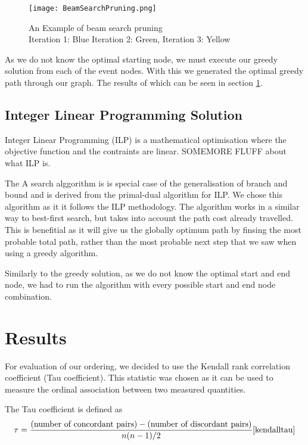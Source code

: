 \documentclass[bsc,frontabs,twoside,singlespacing,parskip,deptreport]{infthesis}     %
\begin{document}
\begin{figure}
  \texttt{[image: BeamSearchPruning.png]}
  \caption{An Example of beam search pruning\\ Iteration 1: Blue Iteration 2: Green, Iteration 3: Yellow}
  \label{fig:beam-prune}
\end{figure}

As we do not know the optimal starting node, we must execute our greedy solution from each of the event nodes.
With this we generated the optimal greedy path through our graph. The results of which can be seen in section \ref{sec:graph-results}.

\subsection{Integer Linear Programming Solution}
Integer Linear Programming (ILP) is a mathematical optimisation where the objective function and the contraints are linear.
SOMEMORE FLUFF about what ILP is.

The A\* search alggorithm is is special case of the generalisation of branch and bound\cite{balas1983branch} and is derived from the primal-dual algorithm for ILP\cite{ye2012note}.
We chose this algorithm as it it follows the ILP methodology. The algorithm works in a similar way to best-first search, but takes into account the path cost already travelled.
This is benefitial as it will give us the globally optimum path by finsing the most probable total path, rather than the most probable next step that we saw when using a
greedy algorithm.

Similarly to the greedy solution, as we do not know the optimal start and end node, we had to run the algorithm with every possible start and end node combination.

\section{Results}\label{sec:graph-results}
For evaluation of our ordering, we decided to use the Kendall rank correlation coefficient (Tau coefficient).
This statistic was chosen as it can be used to measure the ordinal association between two measured quantities.


The Tau coefficient is defined as
\begin{eqnarray}
  \tau=\frac{(\text{number of concordant pairs})-(\text{number of discordant pairs})}{n(n-1)/2}\cite{kendalltau}\nonumber
\end{eqnarray}
\end{document}
